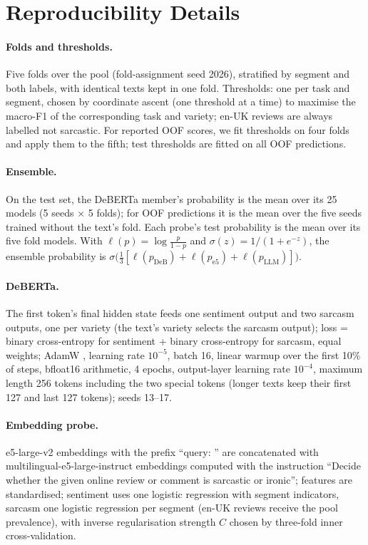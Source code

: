 \documentclass[11pt]{article}
\begin{document}
\section{Reproducibility Details}
\label{app:repro}
\paragraph{Folds and thresholds.} Five folds over the pool (fold-assignment seed 2026), stratified by segment and both labels, with
identical texts kept in one fold. Thresholds: one per task and segment, chosen by coordinate ascent (one threshold at a
time) to maximise the macro-F1 of the corresponding task and variety; en-UK reviews are always labelled not sarcastic. For reported OOF scores, we fit thresholds on four
folds and apply them to the fifth; test thresholds are fitted on all OOF predictions.

\paragraph{Ensemble.} On the test set, the DeBERTa member's probability is the mean over its 25 models (5 seeds
$\times$ 5 folds); for OOF predictions it is the mean over the five seeds trained without the text's fold. Each probe's
test probability is the mean over its five fold models. With $\ell(p)=\log\frac{p}{1-p}$ and
$\sigma(z)=1/(1+e^{-z})$, the ensemble probability is $\sigma\big(\tfrac13[\ell(p_{\mathrm{DeB}})+\ell(p_{\mathrm{e5}})
+\ell(p_{\mathrm{LLM}})]\big)$.

\paragraph{DeBERTa.} The first token's final hidden state feeds one sentiment output and two sarcasm outputs, one per
variety (the text's variety selects the sarcasm output); loss = binary cross-entropy for sentiment + binary cross-entropy for sarcasm, equal weights;
AdamW \citep{loshchilov2019adamw}, learning rate $10^{-5}$, batch 16, linear warmup over the first 10\% of steps, bfloat16 arithmetic, 4 epochs, output-layer learning rate $10^{-4}$, maximum length 256 tokens
including the two special tokens (longer texts keep their first 127 and last 127 tokens); seeds 13--17.

\paragraph{Embedding probe.} e5-large-v2 embeddings with the prefix ``query: '' are concatenated with
multilingual-e5-large-instruct embeddings computed with the instruction ``Decide whether the given online review or
comment is sarcastic or ironic''; features are standardised; sentiment uses one
logistic regression with segment indicators, sarcasm one logistic regression per segment (en-UK reviews receive the
pool prevalence), with inverse
regularisation strength $C$ chosen by three-fold inner cross-validation.
\end{document}
